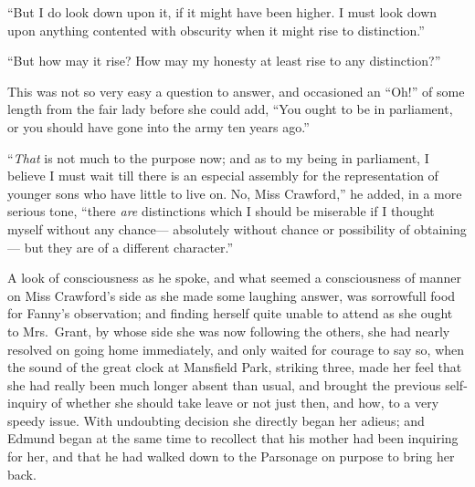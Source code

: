 ``But I do look down upon it, if it might have been higher.
I must look down upon anything contented with obscurity
when it might rise to distinction.''

``But how may it rise?  How may my honesty at least rise
to any distinction?''

This was not so very easy a question to answer,
and occasioned an ``Oh!'' of some length from the fair lady
before she could add, ``You ought to be in parliament,
or you should have gone into the army ten years ago.''

``\emph{That} is not much to the purpose now; and as to my being
in parliament, I believe I must wait till there is an
especial assembly for the representation of younger sons
who have little to live on.  No, Miss Crawford,'' he added,
in a more serious tone, ``there \emph{are} distinctions which I
should be miserable if I thought myself without any chance---%
absolutely without chance or possibility of obtaining---%
but they are of a different character.''

A look of consciousness as he spoke, and what seemed
a consciousness of manner on Miss Crawford's side
as she made some laughing answer, was sorrowfull food
for Fanny's observation; and finding herself quite
unable to attend as she ought to Mrs.\ Grant, by whose
side she was now following the others, she had nearly
resolved on going home immediately, and only waited
for courage to say so, when the sound of the great clock
at Mansfield Park, striking three, made her feel that she
had really been much longer absent than usual, and brought
the previous self-inquiry of whether she should take
leave or not just then, and how, to a very speedy issue.
With undoubting decision she directly began her adieus;
and Edmund began at the same time to recollect that
his mother had been inquiring for her, and that he
had walked down to the Parsonage on purpose to bring her back.

